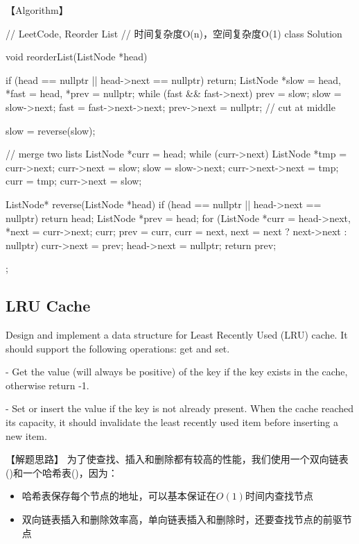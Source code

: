 【Algorithm】
\begin{Code}
	// LeetCode, Reorder List
	// 时间复杂度O(n)，空间复杂度O(1)
	class Solution {
		void reorderList(ListNode *head) {
			if (head == nullptr || head->next == nullptr) return;
			ListNode *slow = head, *fast = head, *prev = nullptr;
			while (fast && fast->next) {
				prev = slow;
				slow = slow->next;
				fast = fast->next->next;
			}
			prev->next = nullptr; // cut at middle
			
			slow = reverse(slow);
			
			// merge two lists
			ListNode *curr = head;
			while (curr->next) {
				ListNode *tmp = curr->next;
				curr->next = slow;
				slow = slow->next;
				curr->next->next = tmp;
				curr = tmp;
			}
			curr->next = slow;
		}
		
		ListNode* reverse(ListNode *head) {
			if (head == nullptr || head->next == nullptr) return head;
			ListNode *prev = head;
			for (ListNode *curr = head->next, *next = curr->next; curr;
				prev = curr, curr = next, next = next ? next->next : nullptr)
				curr->next = prev;
			head->next = nullptr;
			return prev;
		}
	};
\end{Code}


\subsection{LRU Cache}
\label{sec:LRU-Cachet}



Design and implement a data structure for Least Recently Used (LRU) cache. It
should support the following operations: get and set.

 - Get the value (will always be positive) of the key if the key
exists in the cache, otherwise return -1.

 - Set or insert the value if the key is not already
present. When the cache reached its capacity, it should invalidate the least
recently used item before inserting a new item.


【解题思路】
为了使查找、插入和删除都有较高的性能，我们使用一个双向链表()和一个哈希表()，因为：
\begin{itemize}
	\item{哈希表保存每个节点的地址，可以基本保证在$O(1)$时间内查找节点}
	\item{双向链表插入和删除效率高，单向链表插入和删除时，还要查找节点的前驱节点}
\end{itemize}

